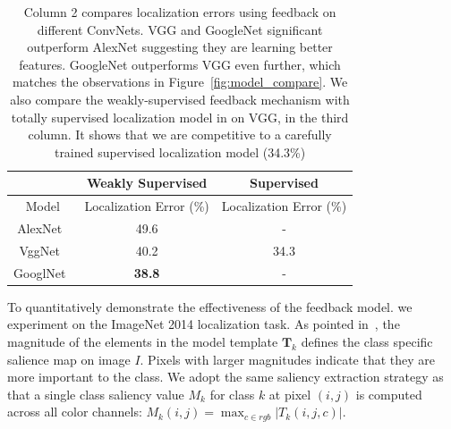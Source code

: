 \begin{table}[htb]
\centering
\small
\begin{tabular}{c|c|c}
\hline
                                      & Weakly Supervised             & Supervised              \\ \hline
Model                                 & Localization Error (\%)       & Localization Error (\%) \\ \hline
AlexNet~\cite{Krizhevsky2012ImageNet} & 49.6                          & -                       \\ \hline
VggNet~\cite{Simonyan2014Very}        & 40.2                          & 34.3\cite{Simonyan2014Very} \\ \hline
GooglNet~\cite{Szegedy2014Going}      & \textbf{38.8}                 & - \\ \hline
\end{tabular}
\caption{Column 2 compares localization errors using feedback on different ConvNets.
VGG and GoogleNet significant outperform AlexNet suggesting they are learning better features. GoogleNet outperforms VGG even further, which matches the observations in Figure~\ref{fig:model_compare}. We also compare the weakly-supervised feedback mechanism with totally supervised localization model in \cite{Simonyan2014Very} on VGG, in the third column. It shows that we are competitive to a carefully trained supervised localization model (34.3\%) }
\label{tab:localization_model_compare}
\end{table}

To quantitatively demonstrate the effectiveness of the feedback model. we experiment on the ImageNet 2014 localization task.
%
As pointed in~\cite{simonyan2013deep}, the magnitude of the elements in the model template $\mathbf{T}_k$ defines the class specific salience map on image $I$. Pixels with larger magnitudes indicate that they are more important to the class. We adopt the same saliency extraction strategy as~\cite{simonyan2013deep} that a single class saliency value $M_k$ for class $k$ at pixel $(i,j)$ is computed across all color channels: $M_k(i,j) = \max_{c \in rgb} | T_k(i,j,c) |$.


